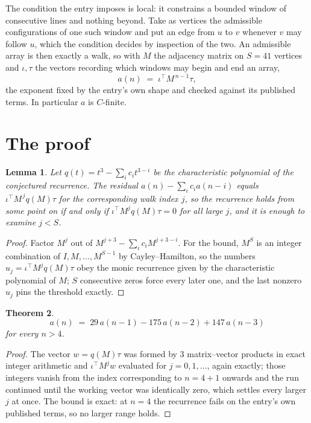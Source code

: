\documentclass[11pt,a4paper]{article}
\theoremstyle{plain}
\newtheorem{theorem}{Theorem}
\newtheorem{lemma}[theorem]{Lemma}
\theoremstyle{definition}
\begin{document}
The condition the entry imposes is local: it constrains a bounded window of consecutive lines and nothing beyond. Take as
vertices the admissible configurations of one such window and put an edge from $u$ to $v$
whenever $v$ may follow $u$, which the condition decides by inspection of the two. An
admissible array is then exactly a walk, so with $M$ the adjacency matrix on $S=41$ vertices
and $\iota,\tau$ the vectors recording which windows may begin and end an array,
\[
a(n)\;=\;\iota^{\!\top}M^{\,n-1}\tau ,
\]
the exponent fixed by the entry's own shape and checked against its published terms. In
particular $a$ is $C$-finite.

\section{The proof}

\begin{lemma}\label{lem:crit}
Let $q(t)=t^{3}-\sum_i c_it^{3-i}$ be the characteristic polynomial of the
conjectured recurrence. The residual $a(n)-\sum_ic_ia(n-i)$ equals
$\iota^{\!\top}M^{\,j}q(M)\tau$ for the corresponding walk index $j$, so the recurrence
holds from some point on if and only if $\iota^{\!\top}M^{j}q(M)\tau=0$ for all large $j$,
and it is enough to examine $j<S$.
\end{lemma}

\begin{proof}
Factor $M^{j}$ out of $M^{j+3}-\sum_ic_iM^{j+3-i}$. For the bound, $M^{S}$
is an integer combination of $I,M,\dots,M^{S-1}$ by Cayley--Hamilton, so the numbers
$u_j=\iota^{\!\top}M^{j}q(M)\tau$ obey the monic recurrence given by the characteristic
polynomial of $M$; $S$ consecutive zeros force every later one, and the last nonzero $u_j$
pins the threshold exactly.
\end{proof}

\begin{theorem}
\[
a(n)\;=\;29\,a(n-1) - 175\,a(n-2) + 147\,a(n-3)
\]
for every $n>4$.
\end{theorem}

\begin{proof}
The vector $w=q(M)\tau$ was formed by $3$ matrix--vector products in exact integer
arithmetic and $\iota^{\!\top}M^{j}w$ evaluated for $j=0,1,\dots$, again exactly; those
integers vanish from the index corresponding to $n=4+1$ onwards and the run continued
until the working vector was identically zero, which settles every larger $j$ at once. The bound is exact: at $n=4$ the recurrence fails on the entry's own published terms, so no larger range holds.
\end{proof}
\end{document}
